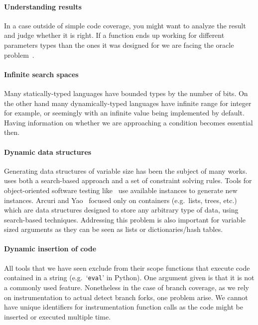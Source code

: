 \documentclass{llncs2e/llncs}
\begin{document}
\paragraph{Understanding results} In a case outside of simple code coverage, you
might want to analyze the result and judge whether it is right. If a function
ends up working for different parameters types than the ones it was designed for
we are facing the oracle problem~\cite{barr2015oracle}.

\paragraph{Infinite search spaces} Many statically-typed languages have bounded
types by the number of bits. On the other hand many dynamically-typed languages
have infinite range for integer for example, or seemingly with an infinite value
being implemented by default. Having information on whether we are approaching a
condition becomes essential then.

\paragraph{Dynamic data structures} Generating data structures of variable size
has been the subject of many works.~\cite{lakhotia2008handling} uses both a
search-based approach and a set of constraint solving rules. Tools for
object-oriented software testing
like~\cite{tonella2004evolutionary,ciupa2008artoo} use available instances to
generate new instances. Arcuri and Yao~\cite{arcuri2008search} focused only on
containers (e.g.\ lists, trees, etc.) which are data structures designed to
store any arbitrary type of data, using search-based techniques. Addressing this
problem is also important for variable sized arguments as they can be seen as
lists or dictionaries/hash tables.

\paragraph{Dynamic insertion of code} All tools that we have seen exclude from
their scope functions that execute code contained in a string (e.g.\
`\texttt{eval}' in Python). One argument given is that it is not a commonly used
feature.  Nonetheless in the case of branch coverage, as we rely on
instrumentation to actual detect branch forks, one problem arise. We cannot have
unique identifiers for instrumentation function calls as the code might be
inserted or executed multiple time.
\end{document}
